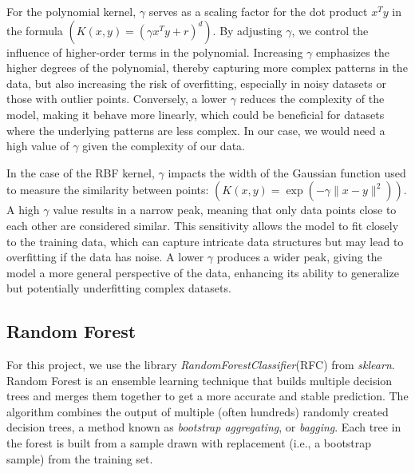 \documentclass[twocolumn]{article}
\begin{document}
For the polynomial kernel, $\gamma$ serves as a scaling factor for the dot product \(x^T y\) in the formula $(K(x, y) = (\gamma x^T y + r)^d)$. By adjusting $\gamma$, we control the influence of higher-order terms in the polynomial. Increasing $\gamma$ emphasizes the higher degrees of the polynomial, thereby capturing more complex patterns in the data, but also increasing the risk of overfitting, especially in noisy datasets or those with outlier points. Conversely, a lower $\gamma$ reduces the complexity of the model, making it behave more linearly, which could be beneficial for datasets where the underlying patterns are less complex. In our case, we would need a high value of $\gamma$ given the complexity of our data.

In the case of the RBF kernel, $\gamma$ impacts the width of the Gaussian function used to measure the similarity between points: $(K(x, y) = \exp(-\gamma \| x - y \|^2))$. A high $\gamma$ value results in a narrow peak, meaning that only data points close to each other are considered similar. This sensitivity allows the model to fit closely to the training data, which can capture intricate data structures but may lead to overfitting if the data has noise. A lower $\gamma$ produces a wider peak, giving the model a more general perspective of the data, enhancing its ability to generalize but potentially underfitting complex datasets.


\begin{comment}
\textbf{Kernel Function}\\
Common choices for the kernel function \(K\) include:
- Polynomial: \(K(\mathbf{x}_i, \mathbf{x}_j) = (\gamma \mathbf{x}_i^T \mathbf{x}_j + r)^d\),
- Radial Basis Function (RBF): \(K(\mathbf{x}_i, \mathbf{x}_j) = \exp(-\gamma \|\mathbf{x}_i - \mathbf{x}_j\|^2)\),
- Sigmoid: \(K(\mathbf{x}_i, \mathbf{x}_j) = \tanh(\gamma \mathbf{x}_i^T \mathbf{x}_j + r)\).
\(\gamma\), \(r\), and \(d\) are parameters that can be tuned according to the specific data and problem requirements.  
\end{comment}

\subsection{Random Forest}
For this project, we use the library \textit{RandomForestClassifier}(RFC) from \textit{sklearn}.
Random Forest is an ensemble learning technique that builds multiple decision trees and merges them together to get a more accurate and stable prediction. The algorithm combines the output of multiple (often hundreds) randomly created decision trees, a method known as \textit{bootstrap aggregating}, or \textit{bagging}. Each tree in the forest is built from a sample drawn with replacement (i.e., a bootstrap sample) from the training set.
\end{document}

